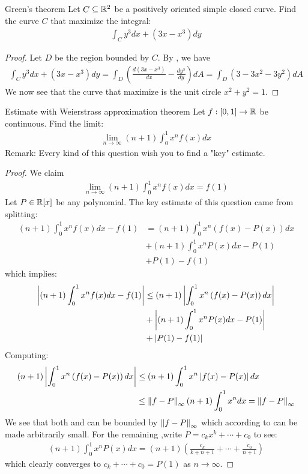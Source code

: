 \documentclass{report}
\begin{document}
\begin{question}{Green's theorem}{}
Let $C\subseteq \mathbb{R}^2$ be a positively oriented simple closed curve. Find the curve $C$ that maximize the integral: 
\begin{align}
\label{EQiC}
\int_C y^3 dx+ (3x-x^3)dy
\end{align}
\end{question}
\begin{proof}
Let $D$ be the region bounded by  $C$. By , we have 
\begin{align*}
\int_C y^3dx+ (3x-x^3)dy= \int_D \left(\frac{d(3x-x^3)}{dx} - \frac{dy^3}{dy} \right) dA= \int_D \left( 3-3x^2-3y^2 \right) dA
\end{align*}
We now see that the curve that maximize  is the unit circle $x^2+y^2=1$. 
\end{proof}
\begin{question}{Estimate with Weierstrass approximation theorem}{}
Let $f:[0,1]\rightarrow \mathbb{R}$ be continuous. Find the limit: 
\begin{align*}
\lim_{n\to \infty}(n+1)\int_0^1 x^nf(x)dx
\end{align*}
Remark: Every kind of this question wish you to find a "key" estimate. 
\end{question}
\begin{proof}
We claim 
\begin{align}
\lim_{n\to \infty} (n+1) \int_0^1 x^nf(x)dx=f(1)
\end{align}
Let $P\in \mathbb{R}[x]$ be any polynomial. The key estimate of this question came from splitting: 
\begin{align*}
  (n+1)\int_0^1 x^nf(x)dx - f(1)&= (n+1) \int_0^1 x^n \left(f(x)-P(x)\right)dx \\
  &+ (n+1)\int_0^1 x^nP(x)dx -P(1) \\
  &+ P(1)-f(1)
\end{align*}
which implies: 
\begin{align}
 \label{EQpn1} \left|(n+1)\int_0^1 x^nf(x)dx-f(1)\right| &\leq  (n+1) \left|\int_0^1 x^n\left(f(x)-P(x)\right)dx\right|  \\
\label{EQpn2}  &+ \left|(n+1)\int_0^1 x^nP(x)dx-P(1)\right|\\
 \label{EQpn3} &+ \left|P(1)-f(1)\right|
\end{align}
Computing: 
\begin{align*}
  (n+1)\left|\int_0^1 x^n \left(f(x)-P(x) \right)dx\right| &\leq (n+1) \int_0^1 x^n \left|f(x)-P(x)\right|dx  \\
  &\leq \left\| f-P \right\|_{\infty} (n+1)\int_0^1 x^n dx= \left\| f-P \right\|_{\infty}
\end{align*}
We see that both  and  can be bounded by $\left\| f-P \right\|_{\infty}$ which according to  can be made arbitrarily small. For the remaining ,write $P=c_kx^k+ \cdots +c_0$ to see: 
\begin{align*}
  (n+1) \int_0^1 x^n P(x)dx= (n+1)\left( \frac{c_k}{k+n+1}+ \cdots + \frac{c_0}{n+1} \right) 
\end{align*}
which clearly converges to $c_k+\cdots + c_0=P(1)$ as $n\rightarrow  \infty $.
\end{proof}
\end{document}
